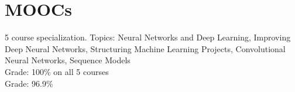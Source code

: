 
\section{MOOCs}
5 course specialization. Topics: Neural Networks and Deep Learning, Improving Deep Neural Networks, Structuring Machine Learning Projects, Convolutional Neural Networks, Sequence Models \\
Grade: 100\% on all 5 courses \\
\vspace{3pt}
Grade: 96.9\% \\
\sectionsep